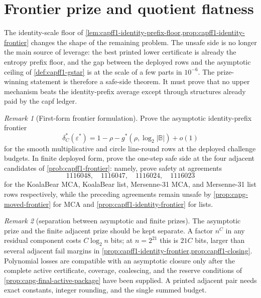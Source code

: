 \documentclass[11pt]{article}
\theoremstyle{definition}
\theoremstyle{remark}
\newtheorem{remark}[remark]{Remark}
\newcommand{\B}{\mathbb{B}}
\begin{document}
\section{Frontier prize and quotient flatness}\label{sec:capfpr-prize}

The identity-scale floor of \cref{lem:capff1-identity-prefix-floor,prop:capff1-identity-frontier} changes the shape of the remaining problem.  The unsafe side is no longer the main source of leverage: the best printed lower certificate is already the entropy prefix floor, and the gap between the deployed rows and the asymptotic ceiling of \cref{def:capff1-gstar} is at the scale of a few parts in $10^{-6}$.  The prize-winning statement is therefore a safe-side theorem.  It must prove that no upper mechanism beats the identity-prefix average except through structures already paid by the capf ledger.

\begin{remark}[First-form frontier formulation]\label{prob:capfpr-frontier-prize}
Prove the asymptotic identity-prefix frontier
\[
        \delta_C^*(\varepsilon^*)
        =1-\rho-g^*(\rho,\log_2|\B|)+o(1)
\]
for the smooth multiplicative and circle line-round rows at the deployed challenge budgets.  In finite deployed form, prove the one-step safe side at the four adjacent candidates of \cref{prob:capff1-frontier}: namely, prove safety at agreements
\[
1116048,\quad 1116047,\quad 1116024,\quad 1116023
\]
for the KoalaBear MCA, KoalaBear list, Mersenne-31 MCA, and Mersenne-31 list rows respectively, while the preceding agreements remain unsafe by \cref{prop:capg-moved-frontier} for MCA and \cref{prop:capff1-identity-frontier} for lists.
\end{remark}

\begin{remark}[separation between asymptotic and finite prizes]\label{rem:capfpr-finite-vs-asymp}
The asymptotic prize and the finite adjacent prize should be kept separate.  A factor $n^{C}$ in any residual component costs $C\log_2 n$ bits; at $n=2^{21}$ this is $21C$ bits, larger than several adjacent fail margins in \cref{prop:capff1-identity-frontier,prop:capff1-closing}.  Polynomial losses are compatible with an asymptotic closure only after the complete active certificate, coverage, coalescing, and the reserve conditions of \cref{prop:capg-final-active-package} have been supplied.  A printed adjacent pair needs exact constants, integer rounding, and the single summed budget.
\end{remark}
\end{document}
